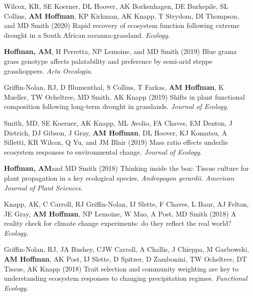 \documentclass{cv}
\begin{document}
\begin{pubenum}
\item Wilcox, KR, SE Koerner, DL Hoover, AK Borkenhagen, DE Burkepile, SL Collins, \textbf{AM Hoffman}, KP Kirkman, AK Knapp, T Strydom, DI Thompson, and MD Smith (2020) Rapid recovery of ecosystem function following extreme drought in a South African savanna-grassland. \textit{Ecology}. 

\item\textbf{Hoffman, AM}\footnotemark[1], H Perretta\footnotemark[2], NP Lemoine, and MD Smith (2019) Blue grama grass genotype affects palatability and preference by semi-arid steppe grasshoppers. \textit{Acta Oecologia}. 


\item Griffin-Nolan, RJ, D Blumenthal, S Collins, T Farkas, \textbf{AM Hoffman}, K Mueller, TW Ocheltree, MD Smith, AK Knapp (2019) Shifts in plant functional composition following long-term drought in grasslands. \textit{Journal of Ecology}. 

\item Smith, MD, SE Koerner, AK Knapp, ML Avolio, FA Chaves, EM Denton, J Dietrich, DJ Gibson, J Gray, \textbf{AM Hoffman}, DL Hoover, KJ Komatsu, A Silletti, KR Wilcox, Q Yu, and JM Blair (2019) Mass ratio effects underlie ecosystem responses to environmental change. \textit{Journal of Ecology}. 

\item\textbf{Hoffman, AM}\footnotemark[1] and MD Smith (2018) Thinking inside the box: Tissue culture for plant propagation in a key ecological species, \textit{Andropogon gerardii}. \textit{American Journal of Plant Sciences}.  

\item Knapp, AK, C Carroll, RJ Griffin-Nolan, IJ Slette, F Chaves, L Baur, AJ Felton, JE Gray, \textbf{AM Hoffman}, NP Lemoine, W Mao, A Post, MD Smith (2018) A reality check for climate change experiments: do they reflect the real world? \textit{Ecology}. 

\item Griffin-Nolan, RJ, JA Bushey, CJW Carroll, A Challis, J Chieppa, M Garbowski, \textbf{AM Hoffman}, AK Post, IJ Slette, D Spitzer, D Zambonini, TW Ocheltree, DT Tissue, AK Knapp  (2018) Trait selection and community weighting are key to understanding ecosystem responses to changing precipitation regimes. \textit{Functional Ecology}. 


\end{pubenum}
\end{document}

